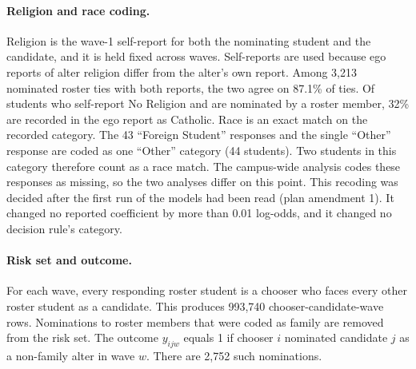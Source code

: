 \paragraph{Religion and race coding.}
Religion is the wave-1 self-report for both the nominating student and the candidate, and it is held fixed across waves. Self-reports are used because ego reports of alter religion differ from the alter's own report. Among 3,213 nominated roster ties with both reports, the two agree on 87.1\% of ties. Of students who self-report No Religion and are nominated by a roster member, 32\% are recorded in the ego report as Catholic. Race is an exact match on the recorded category. The 43 ``Foreign Student'' responses and the single ``Other'' response are coded as one ``Other'' category (44 students). Two students in this category therefore count as a race match. The campus-wide analysis codes these responses as missing, so the two analyses differ on this point. This recoding was decided after the first run of the models had been read (plan amendment 1). It changed no reported coefficient by more than 0.01 log-odds, and it changed no decision rule's category.

\paragraph{Risk set and outcome.}
For each wave, every responding roster student is a chooser who faces every other roster student as a candidate. This produces 993,740 chooser-candidate-wave rows. Nominations to roster members that were coded as family are removed from the risk set. The outcome $y_{ijw}$ equals 1 if chooser $i$ nominated candidate $j$ as a non-family alter in wave $w$. There are 2,752 such nominations.

